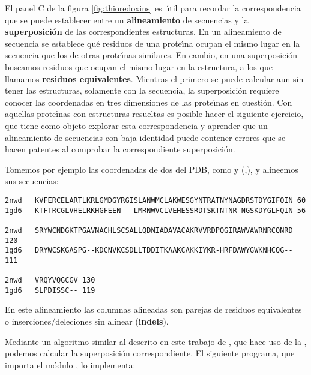 El panel C de la figura \ref{fig:thioredoxins} es \'{u}til para recordar la correspondencia que se puede establecer 
entre un \textbf{alineamiento} de secuencias y la \textbf{superposici\'{o}n} de las correspondientes estructuras. 
En un alineamiento de secuencia se establece qu\'{e} residuos de una prote\'\i{}na ocupan el mismo lugar en la secuencia
que los de otras prote\'\i{}nas similares. 
En cambio, en una superposici\'{o}n buscamos residuos que ocupan el mismo lugar en la estructura, a los que llamamos  
\textbf{residuos equivalentes}.
Mientras el primero se puede calcular aun sin tener las estructuras, solamente con la secuencia, la superposici\'{o}n
requiere conocer las coordenadas en tres dimensiones de las prote\'\i{}nas en cuesti\'{o}n.
Con aquellas prote\'\i{}nas con estructuras resueltas es posible hacer el siguiente ejercicio,
que tiene como objeto explorar esta correspondencia y aprender que un alineamiento de secuencias con baja identidad
puede contener errores que se hacen patentes al comprobar la correspondiente superposici\'{o}n.


Tomemos por ejemplo las coordenadas de dos 
 del PDB, como
 y 
(,), 
y alineemos sus secuencias:
\begin{verbatim}
2nwd   KVFERCELARTLKRLGMDGYRGISLANWMCLAKWESGYNTRATNYNAGDRSTDYGIFQIN 60
1gd6   KTFTRCGLVHELRKHGFEEN---LMRNWVCLVEHESSRDTSKTNTNR-NGSKDYGLFQIN 56

2nwd   SRYWCNDGKTPGAVNACHLSCSALLQDNIADAVACAKRVVRDPQGIRAWVAWRNRCQNRD 120
1gd6   DRYWCSKGASPG--KDCNVKCSDLLTDDITKAAKCAKKIYKR-HRFDAWYGWKNHCQG-- 111

2nwd   VRQYVQGCGV 130
1gd6   SLPDISSC-- 119
\end{verbatim}

En este alineamiento las columnas alineadas son parejas de residuos equivalentes o
inserciones/deleciones sin alinear (\textbf{indels}).

Mediante un algoritmo similar al descrito en este %
trabajo de \citet{McLachlan1979}, que hace uso de la 
,
podemos calcular la superposici\'{o}n correspondiente. El siguiente programa, que importa
el m\'{o}dulo , lo implementa:


